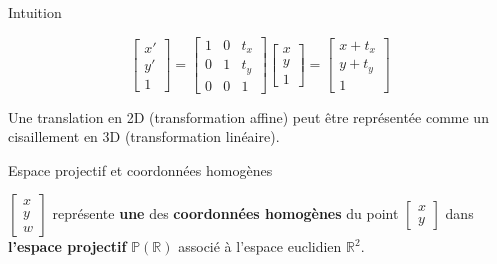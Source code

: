 \documentclass[compress]{beamer}
\begin{document}
\begin{frame}{Intuition}
{    }

\end{frame}

\begin{frame}{}
\[
\begin{bmatrix} x' \\ y' \\ 1 \end{bmatrix} = \begin{bmatrix} 1 & 0 & t_x \\ 0
                                                                 & 1 & t_y \\ 0
                                                                 & 0 & 1
\end{bmatrix} \begin{bmatrix} x \\ y \\ 1 \end{bmatrix} = \begin{bmatrix} x +
    t_x \\ y + t_y
\\ 1 \end{bmatrix}
\]

 {
    Une translation en 2D (transformation affine) peut être représentée comme un
    cisaillement en 3D (transformation linéaire).
}
\end{frame}

\begin{frame}{Espace projectif et coordonnées homogènes}

$\begin{bmatrix} x \\ y \\ w \end{bmatrix}$ représente \textbf{une} des
\textbf{coordonnées homogènes} du point $\begin{bmatrix} x \\ y \end{bmatrix}$ dans \textbf{l'espace
    projectif} $\mathbb{P}(\mathbb{R})$ associé à l'espace euclidien
        $\mathbb{R}^2$.



\end{frame}
\end{document}
